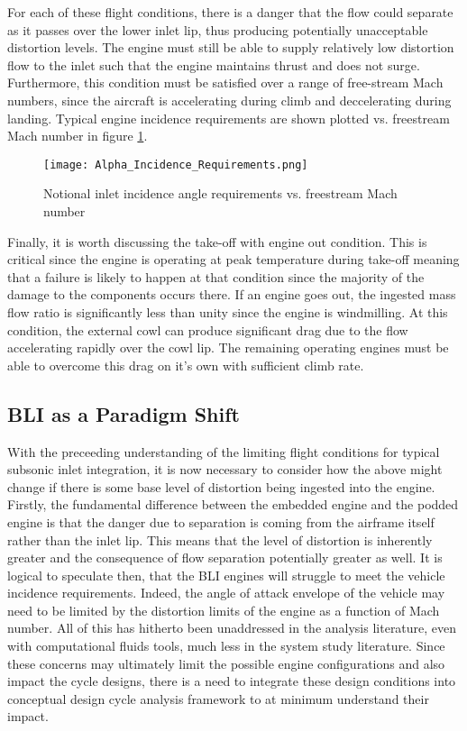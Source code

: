 		For each of these flight conditions, there is a danger that the flow could separate as it passes over the lower inlet lip, thus producing potentially unacceptable distortion levels.  The engine must still be able to supply relatively low distortion flow to the inlet such that the engine maintains thrust and does not surge.  Furthermore, this condition must be satisfied over a range of free-stream Mach numbers, since the aircraft is accelerating during climb and deccelerating during landing.  Typical engine incidence requirements are shown plotted vs. freestream Mach number in figure \ref{Alpha_Incidence_Requirements}.  
		
		\begin{figure}[htpb]
			\centering
			\texttt{[image: Alpha\_Incidence\_Requirements.png]}
			\caption{Notional inlet incidence angle requirements vs. freestream Mach number \cite{Oates1989}}
			\label{Alpha_Incidence_Requirements}
		\end{figure}
		
		Finally, it is worth discussing the take-off with engine out condition.  This is critical since the engine is operating at peak temperature during take-off meaning that a failure is likely to happen at that condition since the majority of the damage to the components occurs there.  If an engine goes out, the ingested mass flow ratio is significantly less than unity since the engine is windmilling.  At this condition, the external cowl can produce significant drag due to the flow accelerating rapidly over the cowl lip.  The remaining operating engines must be able to overcome this drag on it's own with sufficient climb rate.  
		
		\subsection{BLI as a Paradigm Shift}
		\indent With the preceeding understanding of the limiting flight conditions for typical subsonic inlet integration, it is now necessary to consider how the above might change if there is some base level of distortion being ingested into the engine.  Firstly, the fundamental difference between the embedded engine and the podded engine is that the danger due to separation is coming from the airframe itself rather than the inlet lip.  This means that the level of distortion is inherently greater and the consequence of flow separation potentially greater as well.  It is logical to speculate then, that the BLI engines will struggle to meet the vehicle incidence requirements.  Indeed, the angle of attack envelope of the vehicle may need to be limited by the distortion limits of the engine as a function of Mach number.  All of this has hitherto been unaddressed in the analysis literature, even with computational fluids tools, much less in the system study literature.  Since these concerns may ultimately limit the possible engine configurations and also impact the cycle designs, there is a need to integrate these design conditions into conceptual design cycle analysis framework to at minimum understand their impact.  
		
